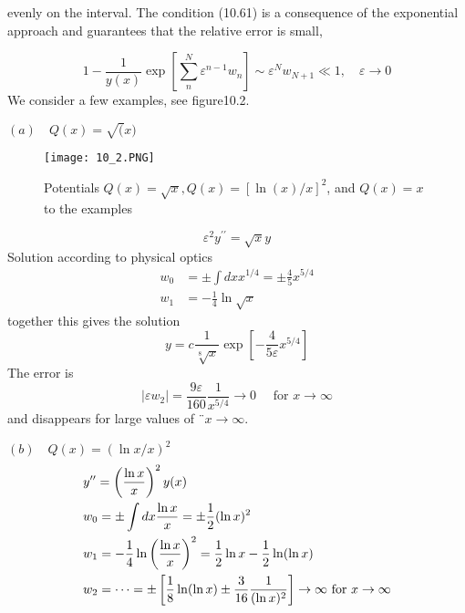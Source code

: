 evenly on the interval. The condition (10.61) is a consequence of the exponential approach and guarantees that the relative error is small,

\begin{equation}
    1-\frac{1}{y(x)} \exp \left[\sum_{n}^{N} \varepsilon^{n-1} w_{n}\right] \sim \varepsilon^{N} w_{N+1} \ll 1, \quad \varepsilon \rightarrow 0
    \end{equation}
We consider a few examples, see figure10.2.\par
$(a) \quad Q(x) = \sqrt(x)$\par
\begin{figure}[ht]
        \centering
        \texttt{[image: 10\_2.PNG]}
        \caption{Potentials $Q(x)=\sqrt{x},Q(x)=[\operatorname{ln}(x)/x]^2$, and $Q (x) = x$ to the
        examples}
\end{figure}
\begin{equation}
    \varepsilon^{2} y^{\prime \prime}=\sqrt{x} y
    \end{equation}
Solution according to physical optics
\begin{equation}
\begin{aligned} w_{0} &=\pm \int d x x^{1 / 4}=\pm \frac{4}{5} x^{5 / 4} \\ w_{1} &=-\frac{1}{4} \ln \sqrt{x} \end{aligned}
\end{equation}
together this gives the solution
\begin{equation}
    y=c \frac{1}{\sqrt[8]{x}} \exp \left[-\frac{4}{5 \varepsilon} x^{5 / 4}\right]
    \end{equation}
The error is
\begin{equation}
    \left|\varepsilon w_{2}\right|=\frac{9 \varepsilon}{160} \frac{1}{x^{5 / 4}} \rightarrow 0 \quad \text { for } x \rightarrow \infty
    \end{equation}
and disappears for large values ​​of $¨ x\rightarrow\infty$.\par
$(b)\quad Q(x) = (\operatorname{ln}x/x)^2$
\begin{align}
    &{y^{\prime \prime}=\left(\frac{\ln x}{x}\right)^{2} y(x)} \vspace{1ex}\\ 
    &{w_{0}=\pm \int d x \frac{\ln x}{x}=\pm \frac{1}{2}(\ln x)^{2}} \vspace{1ex}\nonumber\\ 
    &{w_{1}=-\frac{1}{4} \ln \left(\frac{\ln x}{x}\right)^{2}=\frac{1}{2} \ln x-\frac{1}{2} \ln (\ln x)} \vspace{1ex}\nonumber\\ 
    &{w_{2}=\cdots=\pm\left[\frac{1}{8} \ln (\ln x) \pm \frac{3}{16} \frac{1}{(\ln x)^{2}}\right] \rightarrow \infty} \vspace{1ex}
    {\text { for } x \rightarrow \infty}\end{align}
